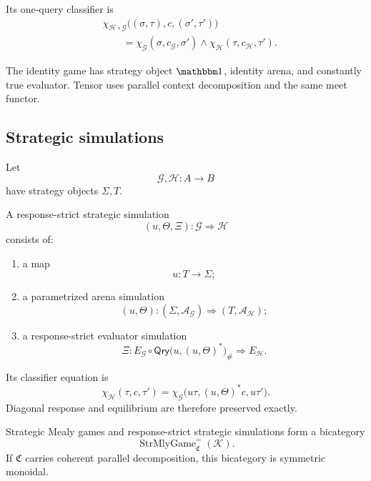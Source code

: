 Its one-query classifier is
\[
\begin{aligned}
&\chi_{\mathcal H\circ\mathcal G}
\bigl(
  (\sigma,\tau),
  c,
  (\sigma',\tau')
\bigr)
\\
&\qquad=
\chi_{\mathcal G}
(\sigma,c_{\mathcal G},\sigma')
\wedge
\chi_{\mathcal H}
(\tau,c_{\mathcal H},\tau').
\end{aligned}
\]

The identity game has strategy object \(\mathbbm1\), identity arena, and constantly true evaluator.
Tensor uses parallel context decomposition and the same meet functor.

\subsection{Strategic simulations}

\begin{definition}
\label{def:strategic-game-simulation}
Let
\[
  \mathcal G,\mathcal H:A\to B
\]
have strategy objects \(\Sigma,T\).

A response-strict strategic simulation
\[
  (u,\Theta,\Xi):
  \mathcal G\Longrightarrow\mathcal H
\]
consists of:
\begin{enumerate}
  \item a map
  \[
    u:T\to\Sigma;
  \]
  \item a parametrized arena simulation
  \[
    (u,\Theta):
    (\Sigma,\mathcal A_{\mathcal G})
    \Longrightarrow
    (T,\mathcal A_{\mathcal H});
  \]
  \item a response-strict evaluator simulation
  \[
    \Xi:
    E_{\mathcal G}
    \circ
    \mathsf{Qry}
    \bigl(
      u,
      (u,\Theta)^*
    \bigr)_\#
    \Longrightarrow
    E_{\mathcal H}.
  \]
\end{enumerate}
\end{definition}

Its classifier equation is
\[
  \chi_{\mathcal H}(\tau,c,\tau')
  =
  \chi_{\mathcal G}
  \bigl(
    u\tau,
    (u,\Theta)^*c,
    u\tau'
  \bigr).
\]
Diagonal response and equilibrium are therefore preserved exactly.

\begin{theorem}
\label{thm:strategic-mealy-bicategory}
Strategic Mealy games and response-strict strategic simulations form a bicategory
\[
  \operatorname{StrMlyGame}^{=}_{\mathfrak C}(\mathcal K).
\]
If \(\mathfrak C\) carries coherent parallel decomposition, this bicategory is symmetric monoidal.
\end{theorem}

